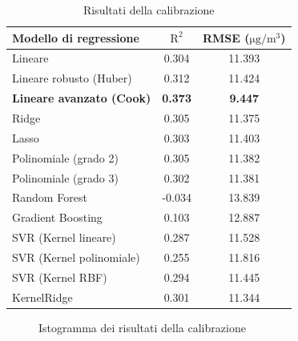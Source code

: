 \begin{table}[H]
    \footnotesize
    \centering
    \def\arraystretch{0.9}
    \begin{tabular}{|l|c|c|}
    \hline
        \textbf{Modello di regressione} & $\bm{\mathrm{R^2}}$ & \textbf{RMSE (}$\mathrm{\si{\micro}g/m^3}$) \\ \hline
        Lineare & 0.304 & 11.393 \\ \hline
        Lineare robusto (Huber) & 0.312 & 11.424 \\ \hline
        \textbf{Lineare avanzato (Cook)} & \textbf{0.373} & \textbf{9.447} \\ \hline
        Ridge & 0.305 & 11.375 \\ \hline
        Lasso & 0.303 & 11.403 \\ \hline
        Polinomiale (grado 2) & 0.305 & 11.382 \\ \hline
        Polinomiale (grado 3) & 0.302 & 11.381 \\ \hline
        Random Forest & -0.034 & 13.839 \\ \hline
        Gradient Boosting & 0.103 & 12.887 \\ \hline
        SVR (Kernel lineare) & 0.287 & 11.528 \\ \hline
        SVR (Kernel polinomiale) & 0.255 & 11.816 \\ \hline
        SVR (Kernel RBF) & 0.294 & 11.445 \\ \hline
        KernelRidge & 0.301 & 11.344 \\ \hline
    \end{tabular}
    \captionsetup{justification=centering}
    \caption{Risultati della calibrazione }
    \label{fig:risultati-no2}
\end{table}

\begin{figure}[H]%
    \centering
    \captionsetup{justification=centering}
    \caption{Istogramma dei risultati della calibrazione }%
    \label{fig:risultati-no2-hist}%
\end{figure}

